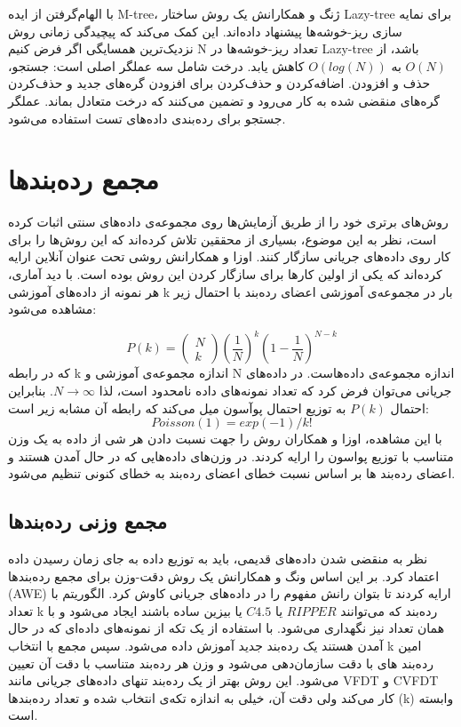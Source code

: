 با الهام‌گرفتن از ایده M-tree، ژنگ و همکارانش یک روش ساختار Lazy-tree برای نمایه سازی ریز-خوشه‌ها پیشنهاد داده‌اند. این کمک می‌کند که پیچیدگی زمانی روش‌ نزدیک‌ترین همسایگی اگر فرض کنیم N تعداد ریز-خوشه‌ها در Lazy-tree باشد، از $O(N)$ به $ O(log(N))$ کاهش یابد. درخت شامل سه عملگر اصلی است: جستجو، حذف و افزودن. اضافه‌کردن و حذف‌کردن برای افزودن گره‌های جدید و حذف‌کردن گره‌های منقضی شده به کار‌ می‌رود و تضمین می‌کنند که درخت متعادل بماند. عملگر جستجو برای رده‌بندی داده‌های تست استفاده می‌شود.


\section{مجمع رده‌بندها}

روش‌های
برتری خود را از طریق آزمایش‌ها روی مجموعه‌ی داده‌های سنتی اثبات کرده‌ است، نظر به این موضوع، بسیاری از محققین تلاش کرده‌اند که این روش‌ها را برای کار روی داده‌های جریانی سازگار کنند.
اوزا
و همکارانش روشی تحت عنوان
آنلاین ارایه کرده‌اند که یکی از اولین‌ کار‌ها برای سازگار کردن این روش بوده است. با دید آماری، هر نمونه از داده‌های آموزشی k بار در مجموعه‌‌ی آموزشی اعضای رده‌بند با احتمال زیر مشاهده می‌شود:


$$
P(k) = \left(\begin{array}{c}N\\ k\end{array}\right)
\left(\frac{1}{N} \right)^{k}
\left(1 - \frac{1}{N} \right)^{N-k}
$$
که در رابطه k اندازه مجموعه‌ی آموزشی و N اندازه مجموعه‌ی داده‌هاست. در داده‌های جریانی می‌توان فرض کرد که تعداد نمونه‌های داده نامحدود است، لذا $N \rightarrow \infty$. بنابراین احتمال $ P(k) $ به توزیع احتمال پوآسون میل می‌کند که رابطه آن مشابه زیر است:
$$Poisson(1) = exp(−1)/k!$$
با این مشاهده، اوزا و همکاران روش
را جهت نسبت دادن هر شی از داده به یک وزن متناسب با توزیع پواسون را ارایه کردند. در
وزن‌های داده‌هایی که در حال آمدن هستند و اعضای رده‌بند ها بر اساس نسبت خطای اعضای رده‌بند به خطای کنونی تنظیم می‌شود.
\subsection{مجمع وزنی رده‌بند‌ها}
نظر به منقضی شدن داده‌های قدیمی، باید به توزیع داده به جای زمان رسیدن داده اعتماد کرد. بر این اساس ونگ
و همکارانش یک روش دقت-وزن‌ برای مجمع رده‌بندها
(AWE)
ارایه کردند تا بتوان رانش مفهوم را در داده‌های جریانی کاوش کرد. الگوریتم با تعداد k رده‌بند که می‌توانند $RIPPER$ یا $C4.5$ یا بیزین ساده باشند ایجاد می‌شود و با همان تعداد نیز نگهداری می‌شود. با استفاده از یک تکه از نمونه‌های داده‌ای که در حال آمدن هستند یک رده‌بند جدید آموزش داده می‌شود. سپس مجمع با انتخاب k امین رده‌بند های با دقت سازمان‌دهی می‌شود و وزن هر رده‌بند متناسب با دقت آن تعیین می‌شود. این روش بهتر از یک رده‌بند تنهای داده‌های جریانی مانند VFDT و CVFDT کار می‌کند ولی دقت‌ آن، خیلی به اندازه تکه‌ی انتخاب شده  و تعداد رده‌بندها (k) وابسته است.

